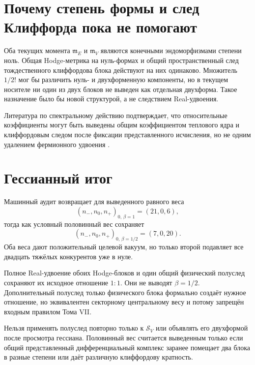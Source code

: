 \section{Почему степень формы и след Клиффорда пока не помогают}

Оба текущих момента $\mathfrak m_E$ и $\mathfrak m_V$ являются конечными
эндоморфизмами степени ноль. Общая Hodge-метрика на нуль-формах и общий
пространственный след тождественного клиффордова блока действуют на них
одинаково. Множитель $1/2!$ мог бы различить нуль- и двухформенную компоненты,
но в текущем носителе ни один из двух блоков не выведен как отдельная
двухформа. Такое назначение было бы новой структурой, а не следствием
Real-удвоения.

Литература по спектральному действию подтверждает, что относительные
коэффициенты могут быть выведены общим коэффициентом теплового ядра и
клиффордовым следом после фиксации представленного исчисления, но не одним
удалением фермионного удвоения
\cite{v7-half-trace-spectral-review,v7-half-trace-wick-doubling}.

\section{Гессианный итог}

Машинный аудит возвращает для выведенного равного веса
\begin{equation}
 (n_-,n_0,n_+)_{0,\,\beta=1}=(21,0,6),
 \label{eq:v7-half-trace-beta-one-origin}
\end{equation}
тогда как условный половинный вес сохраняет
\begin{equation}
 (n_-,n_0,n_+)_{0,\,\beta=1/2}=(7,0,20).
 \label{eq:v7-half-trace-beta-half-origin}
\end{equation}
Оба веса дают положительный целевой вакуум, но только второй подавляет все
двадцать тяжёлых конкурентов уже в нуле.

\begin{theorem}
Полное Real-удвоение обоих Hodge-блоков и один общий физический полуслед
сохраняют их исходное отношение $1:1$. Они не выводят $\beta=1/2$.
Дополнительный полуслед только физического блока формально создаёт нужное
отношение, но эквивалентен секторному центральному весу и потому запрещён
входным правилом Тома VII.
\end{theorem}

\begin{nogocriterion}
Нельзя применять полуслед повторно только к $\mathcal S_V$ или объявлять
его двухформой после просмотра гессиана. Половинный вес считается выведенным
только если общий представленный дифференциальный комплекс заранее помещает
два блока в разные степени или даёт различную клиффордову кратность.
\end{nogocriterion}

